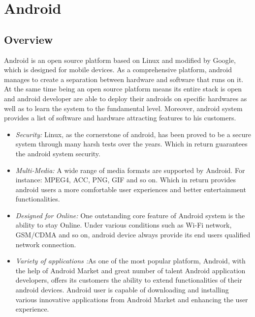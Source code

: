 \section{Android}
\subsection{Overview}
Android is an open source platform based on Linux and modified by Google, which is designed for mobile devices. As a comprehensive platform, android manages to create a separation between hardware and software that runs on it.  At the same time being an open source platform means its entire stack is open and android developer are able to deploy their androids on specific hardwares as well as to learn the system to the fundamental level.\cite{learn_android}
Moreover, android system provides a list of software and hardware attracting features to his customers.
 \begin{itemize}
\item \emph{Security:} Linux, as the cornerstone of android, has been proved to be a secure system through many harsh tests over the years. Which in return guarantees the android system security. \cite{learn_android}
\item \emph{Multi-Media:} A wide range of media formats are supported by Android. For instance: MPEG4, ACC, PNG, GIF and so on. \cite{android_media} Which in return provides android users a more comfortable user experiences and better entertainment functionalities.
\item \emph{Designed for Online:} One outstanding core feature of Android system is the ability to stay Online\cite{android_forensics}. Under various conditions such as Wi-Fi network, GSM/CDMA and so on, android device always provide its end users qualified network connection.
\item \emph{Variety of applications :}As one of the most popular platform,  Android, with the help of Android Market and great number of talent Android application developers, offers its customers the ability to extend  functionalities of their android devices\cite{android_forensics}. Android user is capable of downloading and installing various innovative applications from Android Market and enhancing the user experience.
\end{itemize}
